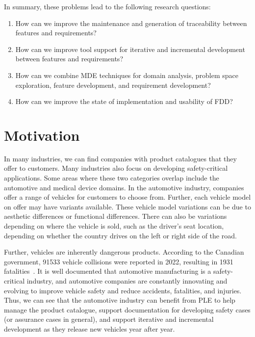 In summary, these problems lead to the following research questions:
\begin{enumerate}[label=\textbf{RQ.\arabic*}]
	\item \label{RQ1} How can we improve the maintenance and generation of traceability between features and requirements?
	\item \label{RQ2} How can we improve tool support for iterative and incremental development between features and requirements?
	\item \label{RQ3} How can we combine \gls{MDE} techniques for domain analysis, problem space exploration, feature development, and requirement development?
	\item \label{RQ4} How can we improve the state of implementation and usability of \gls{FDD}?
\end{enumerate}


\section{Motivation}

In many industries, we can find companies with product catalogues that they offer to customers. Many industries also focus on developing safety-critical applications. Some areas where these two categories overlap include the automotive and medical device domains. In the automotive industry, companies offer a range of vehicles for customers to choose from. Further, each vehicle model on offer may have variants available. These vehicle model variations can be due to aesthetic differences or functional differences. There can also be variations depending on where the vehicle is sold, such as the driver's seat location, depending on whether the country drives on the left or right side of the road. 

Further, vehicles are inherently dangerous products. According to the Canadian government, 91533 vehicle collisions were reported in 2022, resulting in 1931 fatalities~\cite{CanadaCrashStats}. It is well documented that automotive manufacturing is a safety-critical industry, and automotive companies are constantly innovating and evolving to improve vehicle safety and reduce accidents, fatalities, and injuries. Thus, we can see that the automotive industry can benefit from \gls{PLE} to help manage the product catalogue, support documentation for developing safety cases (or assurance cases in general), and support iterative and incremental development as they release new vehicles year after year.

